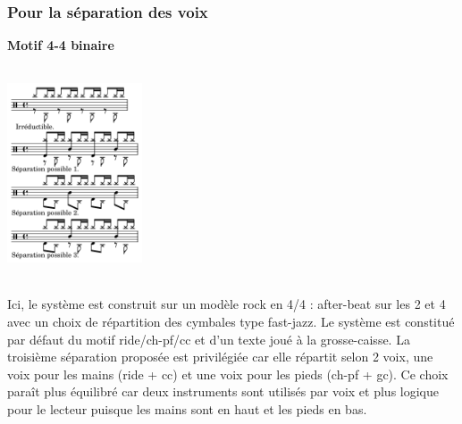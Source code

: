 \subsubsection{Pour la séparation des voix}
\textbf{Motif 4-4 binaire}\\\\
\includegraphics[height=60mm, width=40mm]{z_images/1_description_notation/separation/1_separation_4-4_binaire.png}\\\\
Ici, le système est construit sur un modèle rock en 4/4 : after-beat sur les 2 et 4 avec un choix de répartition des cymbales type fast-jazz. Le système est constitué par défaut du motif ride/ch-pf/cc et d’un texte joué à la grosse-caisse. La troisième séparation proposée est privilégiée car elle répartit selon 2 voix, une voix pour les mains (ride + cc) et une voix pour les pieds (ch-pf + gc). Ce choix paraît plus équilibré car deux instruments sont utilisés par voix et plus logique pour le lecteur puisque les mains sont en haut et les pieds en bas.\\

